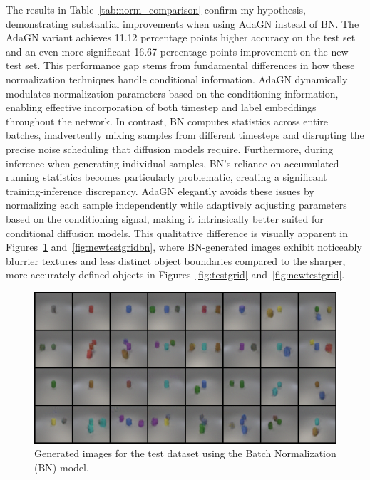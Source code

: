 \documentclass[a4paper,twocolumn]{article}
\begin{document}
The results in Table~\ref{tab:norm_comparison} confirm my hypothesis, demonstrating substantial improvements when using AdaGN instead of BN. The AdaGN variant achieves 11.12 percentage points higher accuracy on the test set and an even more significant 16.67 percentage points improvement on the new test set. This performance gap stems from fundamental differences in how these normalization techniques handle conditional information. AdaGN dynamically modulates normalization parameters based on the conditioning information, enabling effective incorporation of both timestep and label embeddings throughout the network. In contrast, BN computes statistics across entire batches, inadvertently mixing samples from different timesteps and disrupting the precise noise scheduling that diffusion models require. Furthermore, during inference when generating individual samples, BN's reliance on accumulated running statistics becomes particularly problematic, creating a significant training-inference discrepancy. AdaGN elegantly avoids these issues by normalizing each sample independently while adaptively adjusting parameters based on the conditioning signal, making it intrinsically better suited for conditional diffusion models. This qualitative difference is visually apparent in Figures~\ref{fig:testgridbn} and~\ref{fig:newtestgridbn}, where BN-generated images exhibit noticeably blurrier textures and less distinct object boundaries compared to the sharper, more accurately defined objects in Figures~\ref{fig:testgrid} and~\ref{fig:newtestgrid}.

\begin{figure}[H]
\centering
\includegraphics[width=0.95\linewidth]{figures/test_grid_bn}
\caption{Generated images for the test dataset using the Batch Normalization (BN) model.}
\label{fig:testgridbn}
\end{figure}
\end{document}
